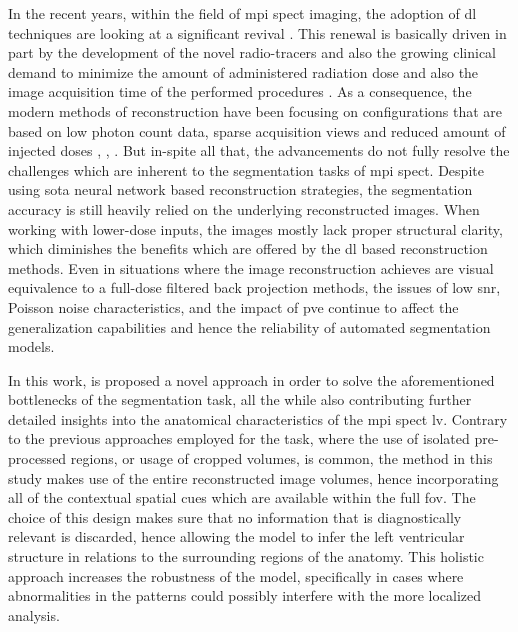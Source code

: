 In the recent years, within the field of \gls{mpi} \gls{spect} imaging, the adoption of \gls{dl} techniques are looking at a significant revival \cite{tolu2025advancements}. This renewal is basically driven in part by the development of the novel radio-tracers and also the growing clinical demand to minimize the amount of administered radiation dose and also the image acquisition time of the performed procedures \cite{henzlova2011future}. As a consequence, the modern methods of reconstruction have been focusing on configurations that are based on low photon count data, sparse acquisition views and reduced amount of injected doses \cite{xie2023transformer}, \cite{xie2024generalizable}, \cite{chen2024dudocfnet}. But in-spite all that, the advancements do not fully resolve the challenges which are inherent to the segmentation tasks of \gls{mpi} \gls{spect}. Despite using \gls{sota} neural network based reconstruction strategies, the segmentation accuracy is still heavily relied on the underlying reconstructed images. When working with lower-dose inputs, the images mostly lack proper structural clarity, which diminishes the benefits which are offered by the \gls{dl} based reconstruction methods. Even in situations where the image reconstruction achieves are visual equivalence to a full-dose filtered back projection methods, the issues of low \gls{snr}, Poisson noise characteristics, and the impact of \gls{pve} continue to affect the generalization capabilities and hence the reliability of automated segmentation models.

In this work, is proposed a novel approach in order to solve the aforementioned bottlenecks of the segmentation task, all the while also contributing further detailed insights into the anatomical characteristics of the \gls{mpi} \gls{spect} \gls{lv}. Contrary to the previous approaches employed for the task, where the use of isolated pre-processed regions, or usage of cropped volumes, is common, the method in this study makes use of the entire reconstructed image volumes, hence incorporating all of the contextual spatial cues which are available within the full \gls{fov}. The choice of this design makes sure that no information that is diagnostically relevant is discarded, hence allowing the model to infer the left ventricular structure in relations to the surrounding regions of the anatomy. This holistic approach increases the robustness of the model, specifically in cases where abnormalities in the patterns could possibly interfere with the more localized analysis.

